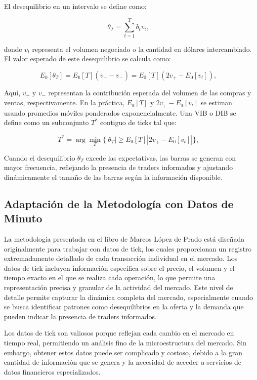 \documentclass[a4paper,12pt, twoside]{report}
\begin{document}
El desequilibrio en un intervalo se define como:

\begin{equation}
\theta_T = \sum_{t=1}^{T} b_t v_t,
\end{equation}

donde \(v_t\) representa el volumen negociado o la cantidad en dólares intercambiado. El valor esperado de este desequilibrio 
se calcula como:

\begin{equation}
E_0[\theta_T] = E_0[T](v_+ - v_-) = E_0[T](2v_+ - E_0[v_t]),
\end{equation}

Aquí, \(v_+\) y \(v_-\) representan la contribución esperada del volumen de las compras y ventas, respectivamente. En la 
práctica, \(E_0[T]\) y \(2v_+ - E_0[v_t]\) se estiman usando promedios móviles ponderados exponencialmente. Una VIB o DIB 
se define como un subconjunto \(T^*\) contiguo de ticks tal que:

\begin{equation}
T^* = \arg \min_{T} \{|\theta_T| \geq E_0[T]|2v_+ - E_0[v_t]| \},
\end{equation}

Cuando el desequilibrio \(\theta_T\) excede las expectativas, las barras se generan con mayor frecuencia, reflejando la 
presencia de traders informados y ajustando dinámicamente el tamaño de las barras según la información disponible.

\subsection{Adaptación de la Metodología con Datos de Minuto}

La metodología presentada en el libro de Marcos López de Prado está diseñada originalmente para trabajar con datos de tick, 
los cuales proporcionan un registro extremadamente detallado de cada transacción individual en el mercado. Los datos de tick 
incluyen información específica sobre el precio, el volumen y el tiempo exacto en el que se realiza cada operación, lo que 
permite una representación precisa y granular de la actividad del mercado. Este nivel de detalle permite capturar la dinámica 
completa del mercado, especialmente cuando se busca identificar patrones como desequilibrios en la oferta y la demanda que 
pueden indicar la presencia de traders informados.

Los datos de tick son valiosos porque reflejan cada cambio en el mercado en tiempo real, permitiendo un análisis fino de la 
microestructura del mercado. Sin embargo, obtener estos datos puede ser complicado y costoso, debido a la gran cantidad de 
información que se genera y la necesidad de acceder a servicios de datos financieros especializados.
\end{document}
